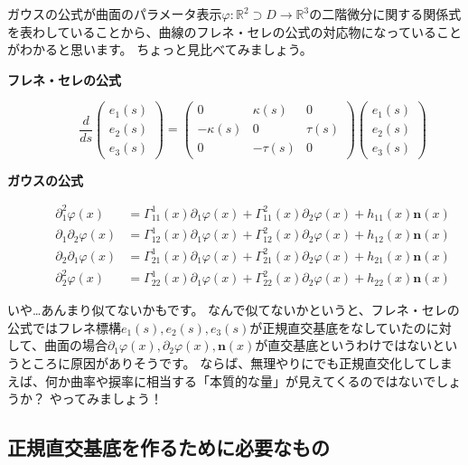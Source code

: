 ガウスの公式が曲面のパラメータ表示$\varphi:\mathbb{R}^2\supset D\to\mathbb{R}^3$の二階微分に関する関係式を表わしていることから、曲線のフレネ・セレの公式の対応物になっていることがわかると思います。
ちょっと見比べてみましょう。
\begin{description}
  \item[\textbf{フレネ・セレの公式}]
  \[
    \frac{d}{ds}\begin{pmatrix}
      e_1(s) \\ e_2(s) \\ e_3(s)
    \end{pmatrix}
    =
    \begin{pmatrix}
      0 & \kappa(s) & 0 \\
      -\kappa(s) & 0 & \tau(s) \\
      0 & -\tau(s) & 0
    \end{pmatrix}
    \begin{pmatrix}
      e_1(s) \\ e_2(s) \\ e_3(s)
    \end{pmatrix}
  \]
  \item[\textbf{ガウスの公式}]
  \begin{align*}
    \partial_1^2\varphi(x)&=\Gamma_{11}^1(x)\partial_1\varphi(x)+\Gamma_{11}^2(x)\partial_2\varphi(x)+h_{11}(x)\mathbf{n}(x)\\
    \partial_1\partial_2\varphi(x)&=\Gamma_{12}^1(x)\partial_1\varphi(x)+\Gamma_{12}^2(x)\partial_2\varphi(x)+h_{12}(x)\mathbf{n}(x)\\
    \partial_2\partial_1\varphi(x)&=\Gamma_{21}^1(x)\partial_1\varphi(x)+\Gamma_{21}^2(x)\partial_2\varphi(x)+h_{21}(x)\mathbf{n}(x)\\
    \partial_2^2\varphi(x)&=\Gamma_{22}^1(x)\partial_1\varphi(x)+\Gamma_{22}^2(x)\partial_2\varphi(x)+h_{22}(x)\mathbf{n}(x)
  \end{align*}
\end{description}
いや…あんまり似てないかもです。
なんで似てないかというと、フレネ・セレの公式ではフレネ標構$e_1(s),e_2(s),e_3(s)$が正規直交基底をなしていたのに対して、曲面の場合$\partial_1\varphi(x),\partial_2\varphi(x),\mathbf{n}(x)$が直交基底というわけではないというところに原因がありそうです。
ならば、無理やりにでも正規直交化してしまえば、何か曲率や捩率に相当する「本質的な量」が見えてくるのではないでしょうか？ やってみましょう！

\subsection{正規直交基底を作るために必要なもの}

